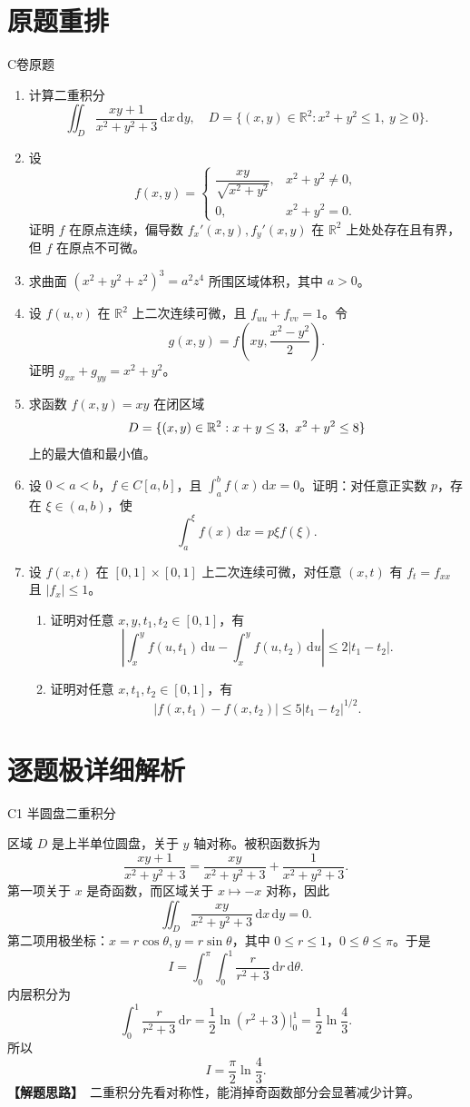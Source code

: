 \documentclass[UTF8,zihao=-4,openany]{ctexbook}
\newcommand{\R}{\mathbb{R}}
\newcommand{\dd}{\,\mathrm{d}}
\newcommand{\thinking}{\textcolor{mainblue}{\bfseries【解题思路】}}
\begin{document}
\section*{原题重排}
\begin{problem}{C卷原题}
\begin{enumerate}[label=\textbf{C\arabic*.}]
\item 计算二重积分
\[
\iint_D\frac{xy+1}{x^2+y^2+3}\dd x\dd y,
\quad
D=\{(x,y)\in\R^2:x^2+y^2\le1,\ y\ge0\}.
\]
\item 设
\[
f(x,y)=\begin{cases}\dfrac{xy}{\sqrt{x^2+y^2}},&x^2+y^2\ne0,\\0,&x^2+y^2=0.
\end{cases}
\]
证明 $f$ 在原点连续，偏导数 $f_x'(x,y),f_y'(x,y)$ 在 $\R^2$ 上处处存在且有界，但 $f$ 在原点不可微。
\item 求曲面 $(x^2+y^2+z^2)^3=a^2z^4$ 所围区域体积，其中 $a>0$。
\item 设 $f(u,v)$ 在 $\R^2$ 上二次连续可微，且 $f_{uu}+f_{vv}=1$。令
\[
g(x,y)=f\left(xy,\frac{x^2-y^2}{2}\right).
\]
证明 $g_{xx}+g_{yy}=x^2+y^2$。
\item 求函数 $f(x,y)=xy$ 在闭区域
\[
D=\{(x,y)\in\R^2:x+y\le3,\\\ x^2+y^2\le8\}
\]
上的最大值和最小值。
\item 设 $0<a<b$，$f\in C[a,b]$，且 $\int_a^bf(x)\dd x=0$。证明：对任意正实数 $p$，存在 $\xi\in(a,b)$，使
\[
\int_a^\xi f(x)\dd x=p\xi f(\xi).
\]
\item 设 $f(x,t)$ 在 $[0,1]\times[0,1]$ 上二次连续可微，对任意 $(x,t)$ 有 $f_t=f_{xx}$ 且 $|f_x|\le1$。
\begin{enumerate}[label=(\arabic*)]
\item 证明对任意 $x,y,t_1,t_2\in[0,1]$，有
\[
\left|\int_x^y f(u,t_1)\dd u-\int_x^y f(u,t_2)\dd u\right|\le2|t_1-t_2|.
\]
\item 证明对任意 $x,t_1,t_2\in[0,1]$，有
\[
|f(x,t_1)-f(x,t_2)|\le5|t_1-t_2|^{1/2}.
\]
\end{enumerate}
\end{enumerate}
\end{problem}

\section*{逐题极详细解析}
\begin{solutionbox}{C1 半圆盘二重积分}

区域 $D$ 是上半单位圆盘，关于 $y$ 轴对称。被积函数拆为
\[
\frac{xy+1}{x^2+y^2+3}=\frac{xy}{x^2+y^2+3}+\frac1{x^2+y^2+3}.
\]
第一项关于 $x$ 是奇函数，而区域关于 $x\mapsto -x$ 对称，因此
\[
\iint_D\frac{xy}{x^2+y^2+3}\dd x\dd y=0.
\]
第二项用极坐标：$x=r\cos\theta,y=r\sin\theta$，其中 $0\le r\le1$，$0\le\theta\le\pi$。于是
\[
I=\int_0^\pi\int_0^1\frac{r}{r^2+3}\dd r\dd\theta.
\]
内层积分为
\[
\int_0^1\frac{r}{r^2+3}\dd r
=\frac12\ln(r^2+3)\bigg|_0^1
=\frac12\ln\frac43.
\]
所以
\[
\boxed{I=\frac\pi2\ln\frac43.}
\]
\thinking\ 二重积分先看对称性，能消掉奇函数部分会显著减少计算。
\end{solutionbox}
\end{document}
